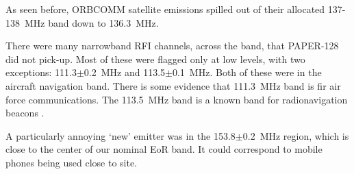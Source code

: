As seen before, ORBCOMM satellite emissions spilled out of their allocated 137-138~MHz band down to 136.3~MHz.

There were many narrowband RFI channels, across the band, that PAPER-128 did not pick-up. Most of these were flagged only at low levels, with two exceptions: 111.3$\pm$0.2~MHz and 113.5$\pm$0.1~MHz. Both of these were in the aircraft navigation band. There is some evidence \citep{airforce} that 111.3~MHz band is fir air force communications. The 113.5~MHz band is a known band for radionavigation beacons \citep[`VOR navaids'][]{navaid}.

A particularly annoying `new' emitter was in the 153.8$\pm$0.2~MHz region, which is close to the center of our nominal EoR band. It could correspond to mobile phones being used close to site.

